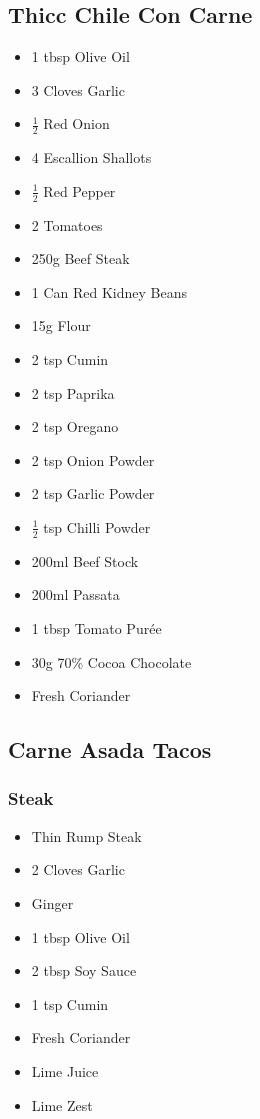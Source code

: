 \documentclass[11pt, english]{article}
\begin{document}
\newpage
	
	\subsection{Thicc Chile Con Carne}

	\begin{itemize}
	\setlength\itemsep{0cm}
		\item 1 tbsp Olive Oil
		\item 3 Cloves Garlic
		\item $\frac{1}{2}$ Red Onion
		\item 4 Escallion Shallots
		\item $\frac{1}{2}$ Red Pepper
		\item 2 Tomatoes
		\item 250g Beef Steak
		\item 1 Can Red Kidney Beans
		\item 15g Flour
		\item 2 tsp Cumin
		\item 2 tsp Paprika
		\item 2 tsp Oregano
		\item 2 tsp Onion Powder
		\item 2 tsp Garlic Powder
		\item $\frac{1}{2}$ tsp Chilli Powder
		\item 200ml Beef Stock
		\item 200ml Passata
		\item 1 tbsp Tomato Pur\'{e}e
		\item 30g 70\% Cocoa Chocolate
		\item Fresh Coriander
	\end{itemize}

\newpage

	\subsection{Carne Asada Tacos}

		\subsubsection*{Steak}

	\begin{itemize}
        \setlength\itemsep{0cm}
		\item Thin Rump Steak
		\item 2 Cloves Garlic
		\item Ginger
		\item 1 tbsp Olive Oil
		\item 2 tbsp Soy Sauce
		\item 1 tsp Cumin
		\item Fresh Coriander
		\item Lime Juice
		\item Lime Zest
	\end{itemize}
\end{document}
